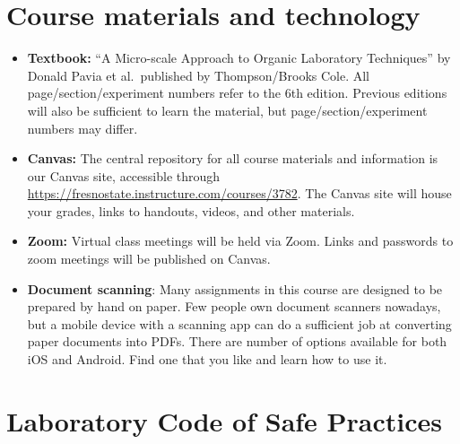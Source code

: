 \hypertarget{course-materials-and-technology}{%
\section{Course materials and
technology}\label{course-materials-and-technology}}

\begin{itemize}
\tightlist
\item
  \textbf{Textbook:} ``A Micro-scale Approach to Organic Laboratory
  Techniques'' by Donald Pavia et al.~published by Thompson/Brooks Cole.
  All page/section/experiment numbers refer to the 6th edition. Previous
  editions will also be sufficient to learn the material, but
  page/section/experiment numbers may differ.
\item
  \textbf{Canvas:} The central repository for all course materials and
  information is our Canvas site, accessible through
  \url{https://fresnostate.instructure.com/courses/3782}. The Canvas
  site will house your grades, links to handouts, videos, and other
  materials.
\item
  \textbf{Zoom:} Virtual class meetings will be held via Zoom. Links and
  passwords to zoom meetings will be published on Canvas.
\item
  \textbf{Document scanning}: Many assignments in this course are
  designed to be prepared by hand on paper. Few people own document
  scanners nowadays, but a mobile device with a scanning app can do a
  sufficient job at converting paper documents into PDFs. There are
  number of options available for both iOS and Android. Find one that
  you like and learn how to use it.
\end{itemize}

\hypertarget{laboratory-code-of-safe-practices}{%
\section{Laboratory Code of Safe
Practices}\label{laboratory-code-of-safe-practices}}

